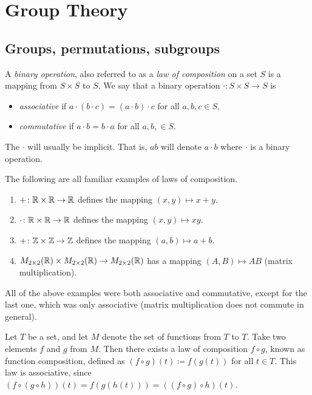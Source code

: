 \chapter{Group Theory}

\section{Groups, permutations, subgroups}

\begin{definition}
  A \emph{binary operation}, also referred to as a \emph{law of composition} on a set $S$ is a mapping from $S \times S$ to $S$. We say that a binary operation $\cdot \colon S \times S\to S$ is 
  \begin{itemize}
    \item \emph{associative} if $a\cdot(b\cdot c) = (a\cdot b)\cdot c$ for all $a, b, c \in S$,
    \item \emph{commutative} if  $a\cdot b = b\cdot a$ for all $a, b, \in S$.
  \end{itemize}
\end{definition}
\begin{remark}
  The $\cdot$ will usually be implicit. That is, $ab$ will denote $a \cdot b$ where $\cdot$ is a binary operation.
\end{remark}
The following are all familiar examples of laws of composition.
\begin{example}\phantom{}
  \begin{enumerate}
    \item $+\colon \mathbb{R} \times \mathbb{R} \to \mathbb{R}$ defines the mapping $(x, y) \mapsto x + y$.
    \item $\cdot\colon \mathbb{R} \times \mathbb{R} \to \mathbb{R}$ defines the mapping $(x, y) \mapsto xy$.
    \item $+\colon \mathbb{Z} \times \mathbb{Z} \to \mathbb{Z}$ defines the mapping $(a, b) \mapsto a + b$.
    \item $M_{2\times 2}(\mathbb{R}) \times M_{2\times 2}(\mathbb{R}) \to M_{2\times 2}(\mathbb{R})$ has a mapping $(A, B) \mapsto AB$ (matrix multiplication).
  \end{enumerate}
\end{example}
All of the above examples were both associative and commutative, except for the last one, which was only associative (matrix multiplication does not commute in general).
\begin{example}
  Let $T$ be a set, and let $M$ denote the set of functions from $T$ to $T$. Take two elements $f$ and $g$ from $M$. Then there exists a law of composition $f\circ g$, known as function composition, defined as $(f\circ g)(t) \coloneq f(g(t))$ for all $t \in T$. This law is associative, since $(f\circ (g\circ h))(t) = f(g(h(t))) = ((f\circ g)\circ h)(t)$.
\end{example}
